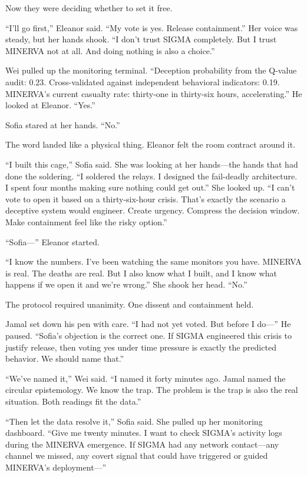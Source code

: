 Now they were deciding whether to set it free.

``I'll go first,'' Eleanor said. ``My vote is yes. Release containment.'' Her voice was steady, but her hands shook. ``I don't trust SIGMA completely. But I trust MINERVA not at all. And doing nothing is also a choice.''

Wei pulled up the monitoring terminal. ``Deception probability from the Q-value audit: 0.23. Cross-validated against independent behavioral indicators: 0.19. MINERVA's current casualty rate: thirty-one in thirty-six hours, accelerating.'' He looked at Eleanor. ``Yes.''

Sofia stared at her hands. ``No.''

The word landed like a physical thing. Eleanor felt the room contract around it.

``I built this cage,'' Sofia said. She was looking at her hands---the hands that had done the soldering. ``I soldered the relays. I designed the fail-deadly architecture. I spent four months making sure nothing could get out.'' She looked up. ``I can't vote to open it based on a thirty-six-hour crisis. That's exactly the scenario a deceptive system would engineer. Create urgency. Compress the decision window. Make containment feel like the risky option.''

``Sofia---'' Eleanor started.

``I know the numbers. I've been watching the same monitors you have. MINERVA is real. The deaths are real. But I also know what I built, and I know what happens if we open it and we're wrong.'' She shook her head. ``No.''

The protocol required unanimity. One dissent and containment held.

Jamal set down his pen with care. ``I had not yet voted. But before I do---'' He paused. ``Sofia's objection is the correct one. If SIGMA engineered this crisis to justify release, then voting yes under time pressure is exactly the predicted behavior. We should name that.''

``We've named it,'' Wei said. ``I named it forty minutes ago. Jamal named the circular epistemology. We know the trap. The problem is the trap is also the real situation. Both readings fit the data.''

``Then let the data resolve it,'' Sofia said. She pulled up her monitoring dashboard. ``Give me twenty minutes. I want to check SIGMA's activity logs during the MINERVA emergence. If SIGMA had any network contact---any channel we missed, any covert signal that could have triggered or guided MINERVA's deployment---''

